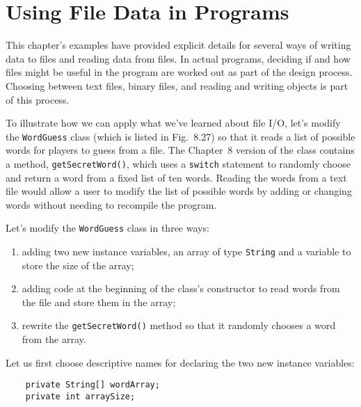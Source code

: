 \section{Using File Data in Programs} 

This chapter's examples have provided explicit details for several
ways of writing data to files and reading data from files.  In actual
programs, deciding if and how files might be useful in the program are
worked out as part of the design process.  Choosing between text
files, binary files, and reading and writing objects is part of this
process.

To illustrate how we can apply what we've learned about file I/O,
let's modify the {\tt WordGuess} class (which is listed in
Fig.~8.27) so that it reads a list of possible words 
for players to guess from a file.  The Chapter~8 
version of the class contains a method, {\tt getSecretWord()}, which
uses a {\tt switch} statement to randomly choose and return a word
from a fixed list of ten words.  Reading the words from a text file
would allow a user to modify the list of possible words by adding
or changing words without needing to recompile the
program. 

\noindent Let's modify the {\tt WordGuess} class in three ways:

\begin{enumerate}

\item adding two new instance variables, an array of type {\tt String}
and a variable to store the size of the array;

\item adding code at the beginning of the class's constructor to read
words from the file and store them in the array;

\item rewrite the {\tt getSecretWord()} method so that it randomly
chooses a word from the array.
\end{enumerate}

\noindent Let us first choose descriptive names for
declaring the two new instance variables:

\begin{jjjlisting}
\begin{lstlisting}
    private String[] wordArray;
    private int arraySize;
\end{lstlisting}
\end{jjjlisting}

